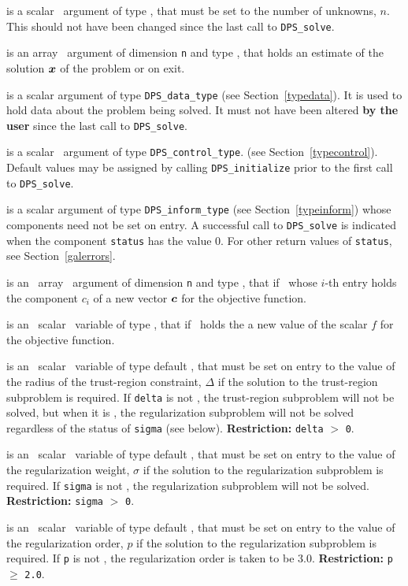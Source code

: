 \documentclass{galahad}
\newcommand{\packagename}{DPS}
\begin{document}
\begin{description}

 is a scalar \intentin\ argument of type \integer, that must be
set to the number of unknowns, $n$. This should not have been changed
since the last call to {\tt \packagename\_solve}.

 is an array \intentout\ argument of dimension {\tt n} and
type \realdp, that holds an estimate of the solution ${\bm{x}}$
of the problem  or  on exit.

 is a scalar \intentinout argument of type
{\tt \packagename\_data\_type}
(see Section~\ref{typedata}). It is used to hold data about the problem being
solved. It must not have been altered {\bf by the user} since the last call to
{\tt \packagename\_solve}.

 is a scalar \intentin\ argument of type
{\tt \packagename\_control\_type}.
(see Section~\ref{typecontrol}).
Default values may be assigned by calling {\tt \packagename\_initialize}
prior to the first call to {\tt \packagename\_solve}.

 is a scalar \intentinout argument of type
{\tt \packagename\_inform\_type}
(see Section~\ref{typeinform}) whose components need not be set on entry.
A successful call to
{\tt \packagename\_solve}
is indicated when the  component {\tt status} has the value 0.
For other return values of {\tt status}, see Section~\ref{galerrors}.

 is an \optional\ array \intentin\ argument of dimension {\tt n} and
type \realdp, that if \present\ whose $i$-th entry holds the
component $c_i$ of a new vector ${\bm{c}}$ for the objective function.

 is an \optional\ scalar \intentin\ variable of type \realdp,
that if \present\ holds the a new value of the scalar
$f$ for the objective function.

 is an \optional\ scalar \intentin\ variable of type default
\realdp, that must be set on entry
to the value of the radius of the trust-region constraint, $\Delta$
if the solution to the trust-region subproblem  is required.
If {\tt delta} is not \present, the trust-region subproblem will not be
solved, but when it is \present, the regularization subproblem will not be
solved regardless of the status of {\tt sigma} (see below).
{\bf Restriction: } {\tt delta} $>$ {\tt 0}.

 is an \optional\ scalar \intentin\ variable of type default
\realdp, that must be set on entry
to the value of the regularization weight, $\sigma$
if the solution to the regularization subproblem  is required.
If {\tt sigma} is not \present, the regularization subproblem will not be
solved.
{\bf Restriction: } {\tt sigma} $>$ {\tt 0}.

 is an \optional\ scalar \intentin\ variable of type default
\realdp, that must be set on entry
to the value of the regularization order, $p$
if the solution to the regularization subproblem  is required.
If {\tt p} is not \present, the regularization order is taken to be
$3.0$.
{\bf Restriction: } {\tt p} $\geq$ {\tt 2.0}.


\end{description}
\end{document}

